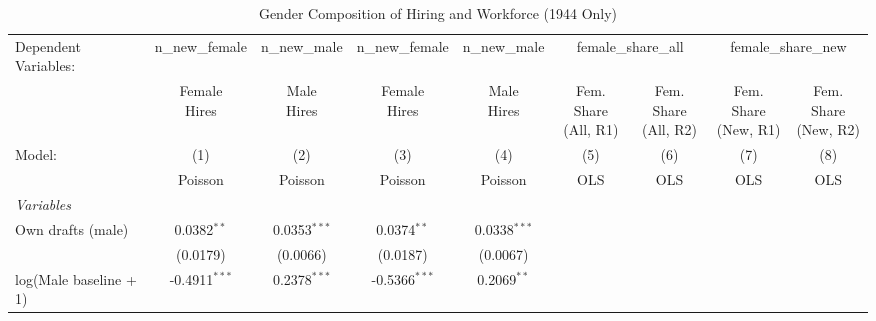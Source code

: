 \begin{table}[htbp]
\centering
\caption{Gender Composition of Hiring and Workforce (1944 Only)}
\label{tab:gender-1944}
\small
\begin{threeparttable}
\begingroup
\centering
\begin{tabular}{lcccccccc}
   \tabularnewline \midrule \midrule
   Dependent Variables: & n\_new\_female & n\_new\_male & n\_new\_female & n\_new\_male & \multicolumn{2}{c}{female\_share\_all} & \multicolumn{2}{c}{female\_share\_new}\\
                               & \makecell{Female\\Hires}    & \makecell{Male\\Hires}    & \makecell{Female\\Hires}    & \makecell{Male\\Hires}    & \makecell{Fem. Share\\(All, R1)}    & \makecell{Fem. Share\\(All, R2)}    & \makecell{Fem. Share\\(New, R1)}    & \makecell{Fem. Share\\(New, R2)} \\      
   Model:                      & (1)                         & (2)                       & (3)                         & (4)                       & (5)                                 & (6)                                 & (7)                                 & (8)\\  
                               &  Poisson                    & Poisson                   & Poisson                     & Poisson                   & OLS                                 & OLS                                 & OLS                                 & OLS\\  
   \midrule
   \emph{Variables}\\
   Own drafts (male)           & 0.0382$^{**}$               & 0.0353$^{***}$            & 0.0374$^{**}$               & 0.0338$^{***}$            &                                     &                                     &                                     &   \\   
                               & (0.0179)                    & (0.0066)                  & (0.0187)                    & (0.0067)                  &                                     &                                     &                                     &   \\   
   log(Male baseline + 1)      & -0.4911$^{***}$             & 0.2378$^{***}$            & -0.5366$^{***}$             & 0.2069$^{**}$             &                                     &                                     &                                     &   \\   

\end{tabular}
\end{threeparttable}
\end{table}
